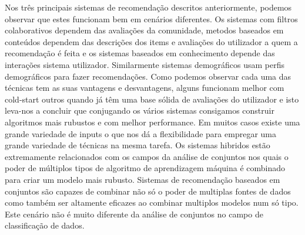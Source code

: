  Nos três principais sistemas de recomendação descritos anteriormente, podemos observar que estes funcionam bem em cenários diferentes. 
 Os sistemas com filtros colaborativos dependem das avaliações da comunidade, metodos baseados em conteúdos dependem das descrições dos items e avaliações do utilizador a quem a recomendação é feita e os sistemas baseados em conhecimento depende das interações sistema utilizador. Similarmente sistemas demográficos usam perfis demográficos para fazer recomendações.
 Como podemos observar cada uma das técnicas tem as suas vantagens e desvantagens, alguns funcionam melhor com cold-start outros quando já têm uma base sólida de avaliações do utilizador e isto leva-nos a concluir que conjugando os vários sistemas consigamos construir algoritmos mais rubustos e com melhor performance.
 Em muitos casos existe uma grande variedade de inputs o que nos dá a flexibilidade para empregar uma grande variedade de técnicas na mesma tarefa.
 Os sistemas hibridos estão extremamente relacionados com os campos da análise de conjuntos nos quais o poder de múltiplos tipos de algoritmo de aprendizagem máquina é combinado para criar um modelo mais rubusto.
 Sistemas de recomendação baseados em conjuntos são capazes de combinar não só o poder de multiplas fontes de dados como também ser altamente eficazes ao combinar multiplos modelos num só tipo. Este cenário não é muito diferente da análise de conjuntos no campo de classificação de dados.